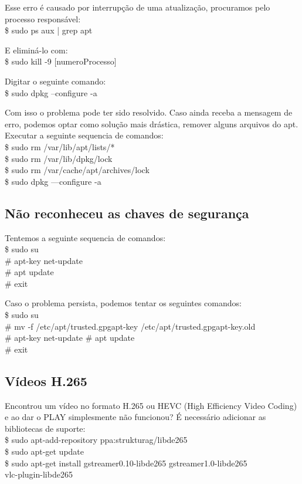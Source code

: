 Esse erro é causado por interrupção de uma atualização, procuramos pelo processo responsável: \\
{\ttfamily\$ sudo ps aux | grep apt}

E eliminá-lo com:\\
{\ttfamily\$ sudo kill -9 [numeroProcesso]}

Digitar o seguinte comando: \\
{\ttfamily\$ sudo dpkg --configure -a}

Com isso o problema pode ter sido resolvido. Caso ainda receba a mensagem de erro, podemos optar como solução mais drástica, remover alguns arquivos do apt. Executar a seguinte sequencia de comandos: \\
{\ttfamily\$ sudo rm /var/lib/apt/lists/* \\
\$ sudo rm /var/lib/dpkg/lock \\
\$ sudo rm /var/cache/apt/archives/lock \\
\$ sudo dpkg ---configure -a}

\subsection{Não reconheceu as chaves de segurança}
Tentemos a seguinte sequencia de comandos: \\
{\ttfamily\$ sudo su \\
\# apt-key net-update \\
\# apt update \\
\# exit}

Caso o problema persista, podemos tentar os seguintes comandos: \\
{\ttfamily\$ sudo su \\
\# mv -f /etc/apt/trusted.gpgapt-key /etc/apt/trusted.gpgapt-key.old \\
\# apt-key net-update
\# apt update \\
\# exit}

\subsection{Vídeos H.265}
Encontrou um vídeo no formato H.265 ou HEVC (High Efficiency Video Coding) e ao dar o PLAY simplesmente não funcionou? É necessário adicionar as bibliotecas de suporte: \\
{\ttfamily\$ sudo apt-add-repository ppa:strukturag/libde265 \\
\$ sudo apt-get update \\
\$ sudo apt-get install gstreamer0.10-libde265 gstreamer1.0-libde265 \\ vlc-plugin-libde265}

